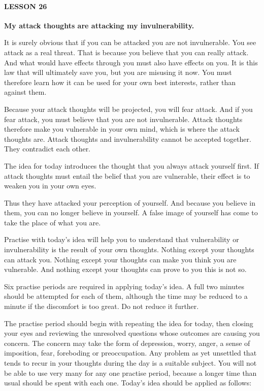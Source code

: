 \paragraph{LESSON 26}


\textbf{My attack thoughts are attacking my invulnerability.}


It is surely obvious that if you can be attacked you are not invulnerable. You see attack as a real threat. That is because you believe that you can really attack. And what would have effects through you must also have effects on you. It is this law that will ultimately save you, but you are misusing it now. You must therefore learn how it can be used for your own best interests, rather than against them.

Because your attack thoughts will be projected, you will fear attack. And if you fear attack, you must believe that you are not invulnerable. Attack thoughts therefore make you vulnerable in your own mind, which is where the attack thoughts are. Attack thoughts and invulnerability cannot be accepted together. They contradict each other.

The idea for today introduces the thought that you always attack yourself first. If attack thoughts must entail the belief that you are vulnerable, their effect is to weaken you in your own eyes.

Thus they have attacked your perception of yourself. And because you believe in them, you can no longer believe in yourself. A false image of yourself has come to take the place of what you are.

Practise with today's idea will help you to understand that vulnerability or invulnerability is the result of your own thoughts. Nothing except your thoughts can attack you. Nothing except your thoughts can make you think you are vulnerable. And nothing except your thoughts can prove to you this is not so.

Six practise periods are required in applying today's idea. A full two minutes should be attempted for each of them, although the time may be reduced to a minute if the discomfort is too great. Do not reduce it further.

The practise period should begin with repeating the idea for today, then closing your eyes and reviewing the unresolved questions whose outcomes are causing you concern. The concern may take the form of depression, worry, anger, a sense of imposition, fear, foreboding or preoccupation. Any problem as yet unsettled that tends to recur in your thoughts during the day is a suitable subject. You will not be able to use very many for any one practise period, because a longer time than usual should be spent with each one. Today's idea should be applied as follows:


